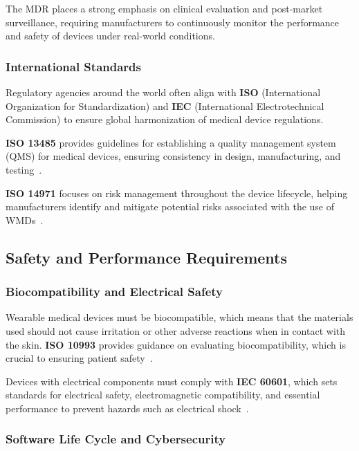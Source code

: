 \documentclass[journal]{IEEEtran}
\begin{document}
        The MDR places a strong emphasis on clinical evaluation and post-market surveillance, requiring manufacturers to continuously monitor the performance and safety of devices under real-world conditions.

        \subsubsection{International Standards}

        Regulatory agencies around the world often align with \textbf{ISO} (International Organization for Standardization) and \textbf{IEC} (International Electrotechnical Commission) to ensure global harmonization of medical device regulations.

        \textbf{ISO 13485} provides guidelines for establishing a quality management system (QMS) for medical devices, ensuring consistency in design, manufacturing, and testing~\cite{ISO2016}.

        \textbf{ISO 14971} focuses on risk management throughout the device lifecycle, helping manufacturers identify and mitigate potential risks associated with the use of WMDs~\cite{ISO2019}.

    \subsection{Safety and Performance Requirements}

        \subsubsection{Biocompatibility and Electrical Safety}

        Wearable medical devices must be biocompatible, which means that the materials used should not cause irritation or other adverse reactions when in contact with the skin. \textbf{ISO 10993} provides guidance on evaluating biocompatibility, which is crucial to ensuring patient safety~\cite{ISO2018}.

        Devices with electrical components must comply with \textbf{IEC 60601}, which sets standards for electrical safety, electromagnetic compatibility, and essential performance to prevent hazards such as electrical shock~\cite{IEC2012}.

        \subsubsection{Software Life Cycle and Cybersecurity}
\end{document}
